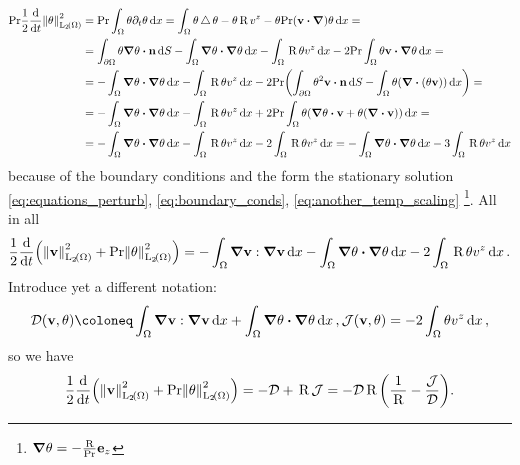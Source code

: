 \documentclass[../main.tex]{subfiles}
\begin{document}
\begin{align*}
	\Prandtl\frac{1}{2}\dv{t} \norm{\theta}_{\LpSet[2]{\Omega}}^{2} &= \Prandtl\int_{\Omega}\theta \partial_t \theta\dd{x} = \int_{\Omega}\theta \laplace \theta - \theta \, \text{R} \, v^z - \theta\Prandtl\qty(\vb{v} \vdot \grad)\theta\dd{x} =\\
									&= \int_{\partial \Omega}\theta \grad \theta \vdot \vb{n}\dd{S} -\int_{\Omega}\grad \theta \vdot \grad \theta\dd{x} - \int_{\Omega}\, \text{R} \, \theta v^z\dd{x} - 2 \Prandtl \int_{\Omega}\theta \vb{v} \vdot \grad \theta\dd{x} = \\
									&= - \int_{\Omega}\grad \theta \vdot \grad \theta\dd{x} - \int_{\Omega}\, \text{R} \,\theta v^z\dd{x} - 2 \Prandtl\qty(\int_{\partial \Omega}\theta^{2}\vb{v} \vdot \vb{n}\dd{S} - \int_{\Omega}\theta \qty(\divergence{\qty(\theta \vb{v})})\dd{x}) =\\
									&= - \int_{\Omega}\grad \theta \vdot \grad \theta\dd{x} - \int_{\Omega}\, \text{R} \,\theta v^z\dd{x} +2 \Prandtl \int_{\Omega}\theta\qty(\grad \theta \vdot \vb{v} + \theta \qty(\divergence{\vb{v}}))\dd{x} =\\
									&= - \int_{\Omega}\grad \theta \vdot \grad \theta\dd{x} - \int_{\Omega}\, \text{R} \,\theta v^z\dd{x}-2  \int_{\Omega}\, \text{R} \, \theta v^z\dd{x} = - \int_{\Omega}\grad \theta \vdot \grad \theta\dd{x} - 3\int_{\Omega}\, \text{R} \,\theta v^z\dd{x}
\end{align*}
because of the boundary conditions and the form the stationary solution \ref{eq:equations_perturb}, \ref{eq:boundary_conds}, \ref{eq:another_temp_scaling}  \footnote{$\grad \theta = - \frac{\, \text{R} \,}{\mathrm{Pr}} \vb{e}_z$}. All in all
\[
	\frac{1}{2}\dv{t} \qty(\norm{\vb{v}}_{\LpSet[2]{\Omega}}^{2} + \Prandtl \norm{\theta}_{\LpSet[2]{\Omega}}^{2}) = -\int_{\Omega}\grad \vb{v} : \grad \vb{v}\dd{x} - \int_{\Omega}\grad \theta \vdot \grad \theta\dd{x} - 2\int_{\Omega}\, \text{R} \, \theta v^z\dd{x}.
\]
Introduce yet a different notation:
\[
	\mathcal{D}\qty(\vb{v}, \theta) \coloneq \int_{\Omega} \grad \vb{v}: \grad \vb{v}\dd{x} + \int_{\Omega}\grad \theta \vdot \grad \theta\dd{x}, \mathcal{J}\qty(\vb{v}, \theta) = -2 \int_{\Omega}\theta v^z\dd{x},
\]
so we have
\[
	\frac{1}{2}\dv{t}\qty(\norm{\vb{v}}_{\LpSet[2]{\Omega}}^{2} + \Prandtl \norm{\theta}_{\LpSet[2]{\Omega}}^{2}) = - \mathcal{D} + \, \text{R} \, \mathcal{J} = - \mathcal{D} \, \text{R} \,\qty(\frac{1}{\, \text{R} \,} - \frac{\mathcal{J}}{\mathcal{D}}).
\]
\end{document}
